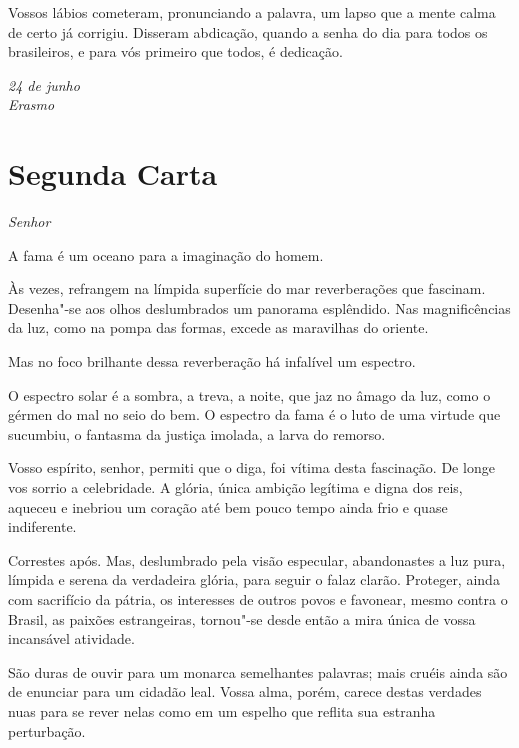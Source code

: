 Vossos lábios cometeram, pronunciando a palavra, um lapso que a mente
calma de certo já corrigiu. Disseram abdicação, quando a senha do dia
para todos os brasileiros, e para vós primeiro que todos, é dedicação.

\begin{flushright}
\textit{24 de junho\\
Erasmo}
\end{flushright}

\chapter[Segunda Carta]{Segunda Carta}

\vspace*{-1ex}

\noindent\textit{Senhor}\smallskip

A fama é um oceano para a imaginação do homem.

Às vezes, refrangem na límpida superfície do mar reverberações que
fascinam. Desenha"-se aos olhos deslumbrados um panorama esplêndido.
Nas magnificências da luz, como na pompa das formas, excede as
maravilhas do oriente. 

Mas no foco brilhante dessa reverberação há infalível um espectro.

O espectro solar é a sombra, a treva, a noite, que jaz no âmago da luz,
como o gérmen do mal no seio do bem. O espectro da fama é o luto de uma
virtude que sucumbiu, o fantasma da justiça imolada, a larva do remorso. 

Vosso espírito, senhor, permiti que o diga, foi vítima desta fascinação.
De longe vos sorrio a celebridade. A glória, única ambição legítima e
digna dos reis, aqueceu e inebriou um coração até bem pouco tempo
ainda frio e quase indiferente. 

Correstes após. Mas, deslumbrado pela visão especular, abandonastes a
luz pura, límpida e serena da verdadeira glória, para seguir o falaz
clarão. Proteger, ainda com sacrifício da pátria, os interesses de
outros povos e favonear, mesmo contra o Brasil, as paixões
estrangeiras, tornou"-se desde então a mira única de vossa incansável atividade. \label{incansavel}

São duras de ouvir para um monarca semelhantes palavras; mais cruéis
ainda são de enunciar para um cidadão leal. Vossa alma, porém, carece
destas verdades nuas para se rever nelas como em um espelho que reflita
sua estranha perturbação.

